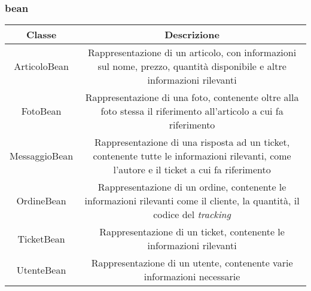 \documentclass[12pt,a4paper]{article}
\begin{document}
\subsubsection{bean}
\begin{center}
\begin{tabular}{|c|c|}
\hline
\rowcolor[HTML]{C0C0C0}
\rowcolor[HTML]{C0C0C0} Classe & Descrizione  \\ \hline
ArticoloBean & \begin{minipage}{10cm} \vspace{5pt}
Rappresentazione di un articolo, con informazioni sul nome, prezzo, quantità disponibile e altre informazioni rilevanti \vspace{5pt}
\end{minipage} \\ \hline
FotoBean & \begin{minipage}{10cm} \vspace{5pt}  Rappresentazione di una foto, contenente oltre alla foto stessa il riferimento all'articolo a cui fa riferimento  \vspace{5pt} \end{minipage}  \\ \hline
MessaggioBean & \begin{minipage}{10cm} \vspace{5pt} Rappresentazione di una risposta ad un ticket, contenente tutte le informazioni rilevanti, come l'autore e il ticket a cui fa riferimento  \vspace{5pt} \end{minipage}  \\ \hline
OrdineBean & \begin{minipage}{10cm} \vspace{5pt} Rappresentazione di un ordine, contenente le informazioni rilevanti come il cliente, la quantità, il codice del \emph{tracking}  \vspace{5pt} \end{minipage}  \\ \hline
TicketBean & \begin{minipage}{10cm} \vspace{5pt} Rappresentazione di un ticket, contenente le informazioni rilevanti \vspace{5pt} \end{minipage}  \\ \hline
UtenteBean & \begin{minipage}{10cm} \vspace{5pt} Rappresentazione di un utente, contenente varie informazioni necessarie  \vspace{5pt} \end{minipage}  \\ \hline
\end{tabular}
\end{center}
\end{document}
